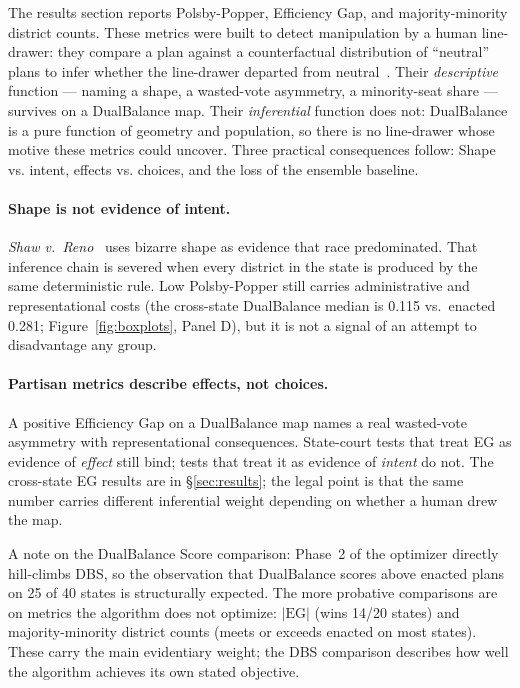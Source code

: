 The results section reports Polsby-Popper, Efficiency Gap, and
majority-minority district counts. These metrics were built to detect
manipulation by a human line-drawer: they compare a plan against a
counterfactual distribution of ``neutral'' plans to infer whether the
line-drawer departed from neutral~\cite{pildes2004}. Their
\emph{descriptive} function --- naming a shape, a wasted-vote
asymmetry, a minority-seat share --- survives on a DualBalance map.
Their \emph{inferential} function does not: DualBalance is a pure
function of geometry and population, so there is no line-drawer whose
motive these metrics could uncover. Three practical consequences follow: 
Shape vs. intent, effects vs. choices, and the loss of the ensemble 
baseline.

\paragraph{Shape is not evidence of intent.}
\textit{Shaw v.~Reno}~\cite{shaw1993} uses bizarre shape as evidence
that race predominated. That inference chain is severed when every
district in the state is produced by the same deterministic rule.
Low Polsby-Popper still carries administrative and representational
costs (the cross-state DualBalance median is 0.115 vs.\ enacted 0.281;
Figure~\ref{fig:boxplots}, Panel D), but it is not a signal of an
attempt to disadvantage any group.

\paragraph{Partisan metrics describe effects, not choices.}
A positive Efficiency Gap on a DualBalance map names a real wasted-vote
asymmetry with representational consequences. State-court tests that
treat EG as evidence of \emph{effect} still bind; tests that treat it
as evidence of \emph{intent} do not. The cross-state EG results are
in \S\ref{sec:results}; the legal point is that the same number carries
different inferential weight depending on whether a human drew the map.

A note on the DualBalance Score comparison: Phase~2 of the optimizer
directly hill-climbs DBS, so the observation that DualBalance scores
above enacted plans on 25 of 40 states is structurally expected. The
more probative comparisons are on metrics the algorithm does not
optimize: $|\mathrm{EG}|$ (wins 14/20 states) and majority-minority
district counts (meets or exceeds enacted on most states). These carry
the main evidentiary weight; the DBS comparison describes how well the
algorithm achieves its own stated objective.


